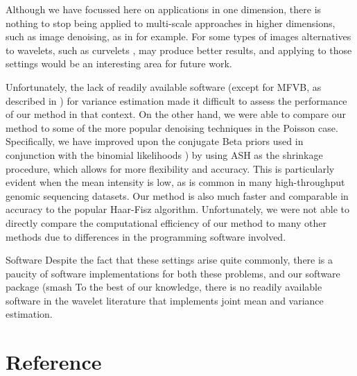 \documentclass[12pt]{article}
\begin{document}
Although we have focussed here on applications in one dimension, there is nothing to stop \ash being applied to multi-scale approaches in higher dimensions, such as image denoising, as in \cite{Nowak1999Multiscale} for example. For some types of images alternatives to wavelets, such as curvelets \cite{Cande00}, may produce better results,
and applying \ash to those settings would be an interesting area for future work.

Unfortunately, the lack of readily available software (except for MFVB, as described in \cite{Menictas2015Variational}) for variance estimation made it difficult to assess the performance of our method in that context. On the other hand, we were able to compare our method to some of the more popular denoising techniques in the Poisson case. Specifically, we have improved upon the conjugate Beta priors used in conjunction with the binomial likelihoods \cite{Kolaczyk1999Bayesian}) by using ASH as the shrinkage procedure, which allows for more flexibility and accuracy. This is particularly evident when the mean intensity is low, as is common in many high-throughput genomic sequencing datasets. Our method is also much faster and comparable in accuracy to the popular Haar-Fisz algorithm. Unfortunately, we were not able to directly compare the computational efficiency of our method to many other methods due to differences in the programming software involved.

Software
Despite the fact that these settings
arise quite commonly, there is a paucity of software implementations for both these problems, and our software package (smash
To the best of our knowledge, there is no readily available software in the wavelet literature that implements joint mean and variance estimation. 

\section{Reference}
\end{document}
